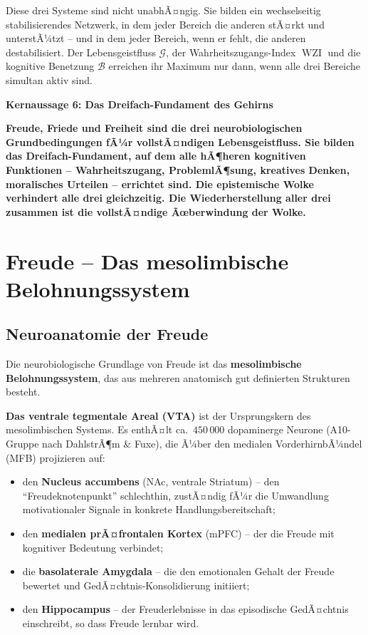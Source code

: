 ﻿\documentclass[12pt,a4paper]{report}
\theoremstyle{plain}
\theoremstyle{definition}
\theoremstyle{remark}
\DeclareMathOperator{\WZI}{WZI}
\begin{document}
	Diese drei Systeme sind nicht unabhÃ¤ngig.
	Sie bilden ein wechselseitig stabilisierendes Netzwerk,
	in dem jeder Bereich die anderen stÃ¤rkt und unterstÃ¼tzt --
	und in dem jeder Bereich, wenn er fehlt, die anderen destabilisiert.
	Der Lebensgeistfluss $\mathcal{G}$, der Wahrheitszu\-gangs-Index $\WZI$
	und die kognitive Benetzung $\mathcal{B}$ erreichen ihr Maximum
	nur dann, wenn alle drei Bereiche simultan aktiv sind.

	
	\noindent\textbf{Kernaussage 6: Das Dreifach-Fundament des Gehirns}

		\textbf{Freude, Friede und Freiheit sind die drei neurobiologischen
		Grundbedingungen fÃ¼r vollstÃ¤ndigen Lebensgeistfluss.
		Sie bilden das Dreifach-Fundament, auf dem alle hÃ¶heren kognitiven
		Funktionen -- Wahrheitszugang, ProblemlÃ¶sung, kreatives Denken,
		moralisches Urteilen -- errichtet sind.
		Die epistemische Wolke verhindert alle drei gleichzeitig.
		Die Wiederherstellung aller drei zusammen ist die vollstÃ¤ndige
		Ãœberwindung der Wolke.}


	\section{Freude -- Das mesolimbische Belohnungssystem}

	\subsection{Neuroanatomie der Freude}

	Die neurobiologische Grundlage von Freude ist das
	\textbf{mesolimbische Belohnungssystem}, das aus mehreren anatomisch
	gut definierten Strukturen besteht.

	\textbf{Das ventrale tegmentale Areal (VTA)} ist der Ursprungskern
	des mesolimbischen Systems. Es enthÃ¤lt ca.\ $450\,000$ dopaminerge
	Neurone (A10-Gruppe nach DahlstrÃ¶m \& Fuxe), die Ã¼ber den medialen
	VorderhirnbÃ¼ndel (MFB) projizieren auf:
	\begin{itemize}
		\item den \textbf{Nucleus accumbens} (NAc, ventrale Striatum) --
		den ``Freudeknotenpunkt'' schlechthin, zustÃ¤ndig fÃ¼r die
		Umwandlung motivationaler Signale in konkrete Handlungsbereitschaft;
		\item den \textbf{medialen prÃ¤frontalen Kortex} (mPFC) --
		der die Freude mit kognitiver Bedeutung verbindet;
		\item die \textbf{basolaterale Amygdala} -- die den emotionalen
		Gehalt der Freude bewertet und GedÃ¤chtnis-Konsolidierung initiiert;
		\item den \textbf{Hippocampus} -- der Freuderlebnisse in das
		episodische GedÃ¤chtnis einschreibt, so dass Freude lernbar wird.
	\end{itemize}
\end{document}
